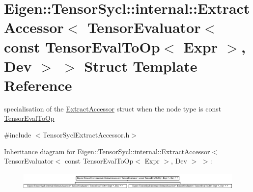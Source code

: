 \hypertarget{struct_eigen_1_1_tensor_sycl_1_1internal_1_1_extract_accessor_3_01_tensor_evaluator_3_01const_0198790cf5cfaea7333b9e857f682a074d}{}\section{Eigen\+:\+:Tensor\+Sycl\+:\+:internal\+:\+:Extract\+Accessor$<$ Tensor\+Evaluator$<$ const Tensor\+Eval\+To\+Op$<$ Expr $>$, Dev $>$ $>$ Struct Template Reference}
\label{struct_eigen_1_1_tensor_sycl_1_1internal_1_1_extract_accessor_3_01_tensor_evaluator_3_01const_0198790cf5cfaea7333b9e857f682a074d}


specialisation of the \hyperlink{struct_eigen_1_1_tensor_sycl_1_1internal_1_1_extract_accessor}{Extract\+Accessor} struct when the node type is const \hyperlink{class_eigen_1_1_tensor_eval_to_op}{Tensor\+Eval\+To\+Op}  




{\ttfamily \#include $<$Tensor\+Sycl\+Extract\+Accessor.\+h$>$}

Inheritance diagram for Eigen\+:\+:Tensor\+Sycl\+:\+:internal\+:\+:Extract\+Accessor$<$ Tensor\+Evaluator$<$ const Tensor\+Eval\+To\+Op$<$ Expr $>$, Dev $>$ $>$\+:\begin{figure}[H]
\begin{center}
\leavevmode
\includegraphics[height=0.900322cm]{struct_eigen_1_1_tensor_sycl_1_1internal_1_1_extract_accessor_3_01_tensor_evaluator_3_01const_0198790cf5cfaea7333b9e857f682a074d}
\end{center}
\end{figure}

